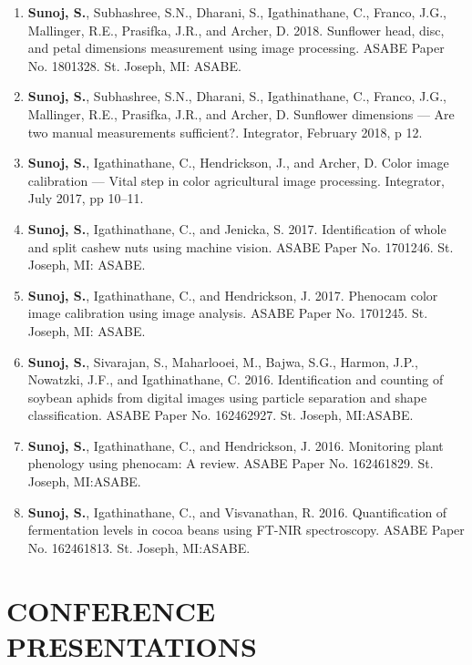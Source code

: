 \documentclass[11pt]{article}
\begin{document}
\begin{enumerate}[itemsep=-2pt]
\item \textbf{Sunoj, S.}, Subhashree, S.N., Dharani, S., Igathinathane, C., Franco, J.G., Mallinger, R.E., Prasifka, J.R., and Archer, D.  2018. Sunflower head, disc, and petal dimensions measurement using image processing. ASABE Paper No. 1801328. St. Joseph, MI: ASABE.

\item \textbf{Sunoj, S.}, Subhashree, S.N., Dharani, S., Igathinathane, C., Franco, J.G., Mallinger, R.E., Prasifka, J.R., and Archer, D. Sunflower dimensions --- Are two manual measurements sufficient?. Integrator, February 2018, p 12.

\item \textbf{Sunoj, S.}, Igathinathane, C., Hendrickson, J., and Archer, D. Color image calibration --- Vital step in color agricultural image processing. Integrator, July 2017, pp 10--11.

\item \textbf{Sunoj, S.}, Igathinathane, C., and Jenicka, S. 2017. Identification of whole and split cashew nuts using machine vision. ASABE Paper No. 1701246. St. Joseph, MI: ASABE.

\item \textbf{Sunoj, S.}, Igathinathane, C., and Hendrickson, J. 2017. Phenocam color image calibration using image analysis. ASABE Paper No. 1701245. St. Joseph, MI: ASABE.

\item \textbf{Sunoj, S.}, Sivarajan, S., Maharlooei, M., Bajwa, S.G., Harmon, J.P., Nowatzki, J.F., and Igathinathane, C. 2016. Identification and counting of soybean aphids from digital images using particle separation and shape classification. ASABE Paper No. 162462927.  St. Joseph, MI:ASABE.

\item \textbf{Sunoj, S.}, Igathinathane, C., and Hendrickson, J. 2016. Monitoring plant phenology using phenocam: A review. ASABE Paper No. 162461829. St. Joseph, MI:ASABE.

\item \textbf{Sunoj, S.}, Igathinathane, C., and Visvanathan, R. 2016. Quantification of fermentation levels in cocoa beans using FT-NIR spectroscopy. ASABE Paper No. 162461813. St. Joseph, MI:ASABE.

\end{enumerate}

\newpage
\section*{CONFERENCE PRESENTATIONS}
\end{document}
